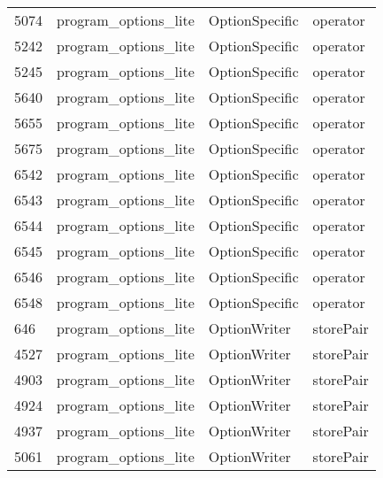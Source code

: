 \begin{tabular}{llll}
5074 &  program\_options\_lite &             OptionSpecific &                                  operator \\
5242 &  program\_options\_lite &             OptionSpecific &                                  operator \\
5245 &  program\_options\_lite &             OptionSpecific &                                  operator \\
5640 &  program\_options\_lite &             OptionSpecific &                                  operator \\
5655 &  program\_options\_lite &             OptionSpecific &                                  operator \\
5675 &  program\_options\_lite &             OptionSpecific &                                  operator \\
6542 &  program\_options\_lite &             OptionSpecific &                                  operator \\
6543 &  program\_options\_lite &             OptionSpecific &                                  operator \\
6544 &  program\_options\_lite &             OptionSpecific &                                  operator \\
6545 &  program\_options\_lite &             OptionSpecific &                                  operator \\
6546 &  program\_options\_lite &             OptionSpecific &                                  operator \\
6548 &  program\_options\_lite &             OptionSpecific &                                  operator \\
646  &  program\_options\_lite &               OptionWriter &                                 storePair \\
4527 &  program\_options\_lite &               OptionWriter &                                 storePair \\
4903 &  program\_options\_lite &               OptionWriter &                                 storePair \\
4924 &  program\_options\_lite &               OptionWriter &                                 storePair \\
4937 &  program\_options\_lite &               OptionWriter &                                 storePair \\
5061 &  program\_options\_lite &               OptionWriter &                                 storePair \\

\end{tabular}
